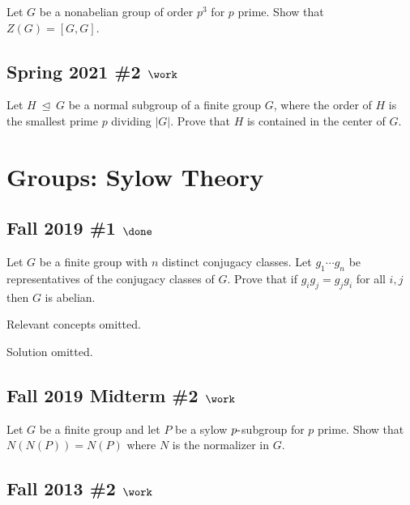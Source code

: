 Let \(G\) be a nonabelian group of order \(p^3\) for \(p\) prime. Show
that \(Z(G) = [G, G]\).

\hypertarget{spring-2021-2-work}{%
\subsection{\texorpdfstring{Spring 2021 \#2
\(\work\)}{Spring 2021 \#2 \textbackslash work}}\label{spring-2021-2-work}}

Let \(H {~\trianglelefteq~}G\) be a normal subgroup of a finite group
\(G\), where the order of \(H\) is the smallest prime \(p\) dividing
\({\left\lvert {G} \right\rvert}\). Prove that \(H\) is contained in the
center of \(G\).

\hypertarget{groups-sylow-theory}{%
\section{Groups: Sylow Theory}\label{groups-sylow-theory}}

\hypertarget{fall-2019-1-done}{%
\subsection{\texorpdfstring{Fall 2019 \#1
\(\done\)}{Fall 2019 \#1 \textbackslash done}}\label{fall-2019-1-done}}

Let \(G\) be a finite group with \(n\) distinct conjugacy classes. Let
\(g_1 \cdots g_n\) be representatives of the conjugacy classes of \(G\).
Prove that if \(g_i g_j = g_j g_i\) for all \(i, j\) then \(G\) is
abelian.

Relevant concepts omitted.

Solution omitted.

\hypertarget{fall-2019-midterm-2-work}{%
\subsection{\texorpdfstring{Fall 2019 Midterm \#2
\(\work\)}{Fall 2019 Midterm \#2 \textbackslash work}}\label{fall-2019-midterm-2-work}}

Let \(G\) be a finite group and let \(P\) be a sylow
\(p{\hbox{-}}\)subgroup for \(p\) prime. Show that \(N(N(P)) = N(P)\)
where \(N\) is the normalizer in \(G\).

\hypertarget{fall-2013-2-work}{%
\subsection{\texorpdfstring{Fall 2013 \#2
\(\work\)}{Fall 2013 \#2 \textbackslash work}}\label{fall-2013-2-work}}

